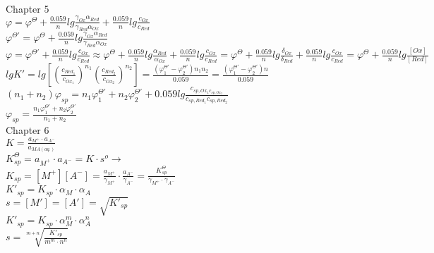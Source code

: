 \documentclass[10pt,twocolumn]{article}
\begin{document}
    \\ Chapter 5
    \\ \(\varphi = \varphi^\Theta + \frac{0.059}{n}lg\frac{\gamma_{Ox}\alpha_{Red}}{\gamma_{Red}\alpha_{Ox}} + \frac{0.059}{n}lg\frac{c_{Ox}}{c_{Red}}\)
    \\ \(\varphi^{\Theta'} = \varphi^\Theta + \frac{0.059}{n}lg\frac{\gamma_{Ox}\alpha_{Red}}{\gamma_{Red}\alpha_{Ox}}\)
    \\ \(\varphi = \varphi^{\Theta'} + \frac{0.059}{n}lg\frac{c_{Ox}}{c_{Red}} \approx \varphi^{\Theta} + \frac{0.059}{n}lg\frac{\alpha_{Red}}{\alpha_{Ox}} + \frac{0.059}{n}lg\frac{c_{Ox}}{c_{Red}} = \varphi^{\Theta} + \frac{0.059}{n}lg\frac{\delta_{Ox}}{\delta_{Red}} + \frac{0.059}{n}lg\frac{c_{Ox}}{c_{Red}} = \varphi^{\Theta} + \frac{0.059}{n}lg\frac{[Ox]}{[Red]}\) \quad
    \\ \(lgK' = lg [{(\frac{c_{{Red}_1}}{c_{{Ox}_1}})}^{n_1}{(\frac{c_{{Red}_2}}{c_{{Ox}_2}})}^{n_2}] = \frac{(\varphi_1^{\Theta '}-\varphi_2^{\Theta '})n_1n_2}{0.059} = \frac{(\varphi_1^{\Theta '}-\varphi_2^{\Theta '})n}{0.059}\)
    \\ \((n_1+n_2)\varphi_{sp} = n_1\varphi_1^{\Theta '} + n_2\varphi_2^{\Theta '} + 0.059lg\frac{c_{sp,Ox_1 c_{sp,Ox_2}}}{c_{sp,Red_1} c_{sp,Red_2}}\)
    \\ \(\varphi_{sp} = \frac{n_1\varphi_1^{\Theta '} + n_2\varphi_2^{\Theta '}}{n_1+n_2}\)
    \\ Chapter 6
    \\ \(K=\frac{a_{M^+} \cdot a_{A^-}}{a_{MA(aq.)}}\)
    \\ \(K^{\Theta}_{sp} = a_{M^+} \cdot a_{A^-} = K \cdot s^o \rightarrow\)
    \\ \(K_{sp} = [M^+][A^-] = \frac{a_{M^+}}{\gamma_{M^+}} \cdot \frac{a_{A^-}}{\gamma_{A^-}} = \frac{K^{\Theta}_{sp}}{\gamma_{M^+} \cdot \gamma_{A^-}}\)
    \\ \(K'_{sp} = K_{sp} \cdot \alpha_{M} \cdot \alpha_{A}\)
    \\ \(s=[M']=[A']=\sqrt{K'_{sp}}\)
    \\ \(K'_{sp} = K_{sp} \cdot \alpha_M^m \cdot \alpha_A^{n}\)
    \\ \(s=\sqrt[m+n]{\frac{K'_{sp}}{m^m \cdot n^n}}\)
\end{document}
